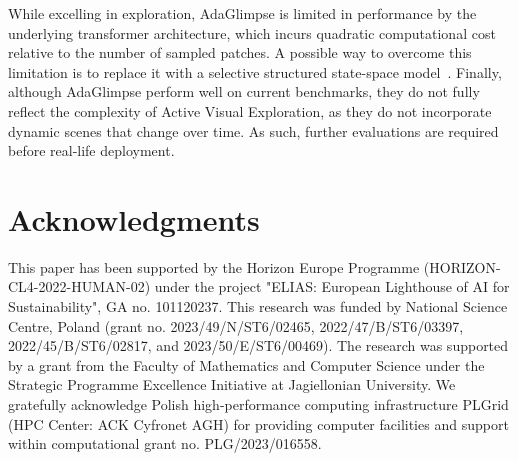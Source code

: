 \documentclass[runningheads]{llncs}
\newcommand{\ours}[0]{AdaGlimpse}
\begin{document}
While excelling in exploration, \ours{} is limited in performance by the underlying transformer architecture, which incurs quadratic computational cost relative to the number of sampled patches. A possible way to overcome this limitation is to replace it with a selective structured state-space model~\cite{gu2021efficiently,gu2023mamba}. Finally, although \ours{} perform well on current benchmarks, they do not fully reflect the complexity of Active Visual Exploration, as they do not incorporate dynamic scenes that change over time. As such, further evaluations are required before real-life deployment.

\section*{Acknowledgments}


This paper has been supported by the Horizon Europe Programme (HORIZON-CL4-2022-HUMAN-02) under the project "ELIAS: European Lighthouse of AI for Sustainability", GA no. 101120237.
This research was funded by National Science Centre, Poland (grant no. 2023/49/N/ST6/02465, 2022/47/B/ST6/03397, 2022/45/B/ST6/02817, and 2023/50/E/ST6/00469).
The research was supported by a grant from the Faculty of Mathematics and Computer Science under the Strategic Programme Excellence Initiative at Jagiellonian University.
We gratefully acknowledge Polish high-performance computing infrastructure PLGrid (HPC Center: ACK Cyfronet AGH) for providing computer facilities and support within computational grant no. PLG/2023/016558.


%
%


\end{document}

